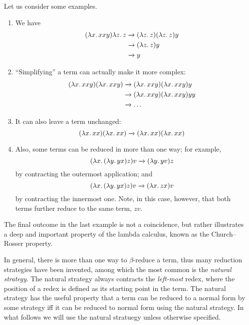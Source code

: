 \documentclass[../../../include/open-logic-section]{subfiles}
\begin{document}
Let us consider some examples.
\begin{enumerate}
\item We have
\begin{align*}
(\lambd[x][xxy]) \lambd[z][z] & \redone (\lambd[z][z])(\lambd[z][z]) y \\
& \redone (\lambd[z][z]) y \\
& \redone y
\end{align*}
\item ``Simplifying'' a term can actually make it more complex:
\begin{align*}
(\lambd[x][xxy])(\lambd[x][xxy]) & \redone (\lambd[x][xxy])(\lambd[x][xxy])y \\
& \redone (\lambd[x][xxy])(\lambd[x][xxy])yy \\
& \redone \dots
\end{align*}
\item It can also leave a term unchanged:
\[
(\lambd[x][xx])(\lambd[x][xx]) \redone (\lambd[x][xx])(\lambd[x][xx])
\]
\item Also, some terms can be reduced in more than one way; for
  example,
\[
(\lambd[x][(\lambd[y][yx]) z]) v \redone (\lambd[y][yv]) z
\]
by contracting the outermost application; and
\[
(\lambd[x][(\lambd[y][yx]) z]) v \redone (\lambd[x][zx]) v
\]
by contracting the innermost one. Note, in this case, however, that
both terms further reduce to the same term, $zv$.
\end{enumerate}

The final outcome in the last example is not a coincidence, but rather
illustrates a deep and important property of the lambda calculus, known as the
Church--Rosser property.

\begin{digress}
  In general, there is more than one way to $\beta$-reduce a term,
  thus many reduction strategies have been invented, among which the
  most common is the \emph{natural strategy}.  The natural strategy
  always contracts the \emph{left-most} redex, where the position of a
  redex is defined as its starting point in the term.  The natural
  strategy has the useful property that a term can be reduced to a
  normal form by some strategy iff it can be reduced to normal form
  using the natural strategy. In what follows we will use the natural
  stratuegy unless otherwise specified.
\end{digress}
\end{document}
